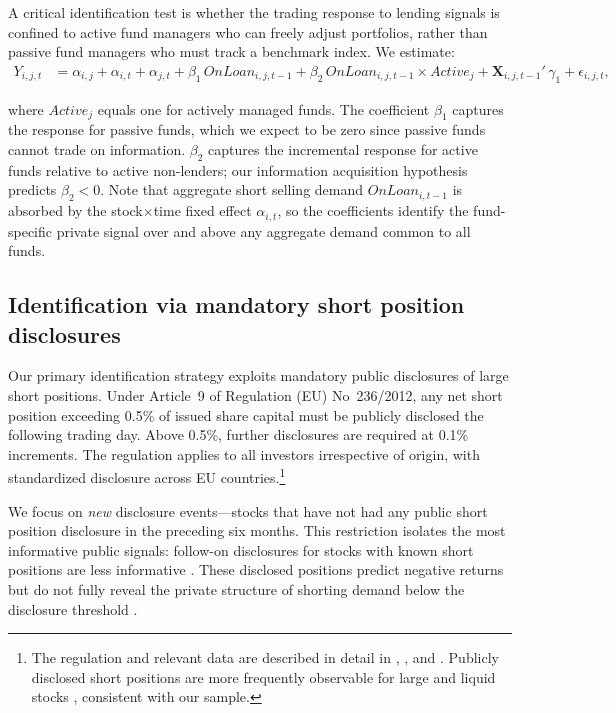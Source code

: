 A critical identification test is whether the trading response to lending signals is confined to active fund managers who can freely adjust portfolios, rather than passive fund managers who must track a benchmark index. We estimate:
\begin{align} \label{eq:baseline_active}
Y_{i,j,t} & = \alpha_{i,j} + \alpha_{i,t} + \alpha_{j,t} + \beta_{1}\, \mathit{OnLoan}_{i,j,t-1} + \beta_{2}\, \mathit{OnLoan}_{i,j,t-1} \times \mathit{Active}_{j} + \mathbf{X}_{i,j,t-1}'\,\gamma_1 + \epsilon_{i,j,t},
\end{align}

\noindent where $\mathit{Active}_j$ equals one for actively managed funds. The coefficient $\beta_1$ captures the response for passive funds, which we expect to be zero since passive funds cannot trade on information. $\beta_2$ captures the incremental response for active funds relative to active non-lenders; our information acquisition hypothesis predicts $\beta_2 < 0$. Note that aggregate short selling demand $\mathit{OnLoan}_{i,t-1}$ is absorbed by the stock$\times$time fixed effect $\alpha_{i,t}$, so the coefficients identify the fund-specific private signal over and above any aggregate demand common to all funds.

\subsection{Identification via mandatory short position disclosures} \label{subsec:identification-disclosure}

Our primary identification strategy exploits mandatory public disclosures of large short positions. Under Article~9 of Regulation (EU) No~236/2012, any net short position exceeding 0.5\% of issued share capital must be publicly disclosed the following trading day. Above 0.5\%, further disclosures are required at 0.1\% increments. The regulation applies to all investors irrespective of origin, with standardized disclosure across EU countries.\footnote{The regulation and relevant data are described in detail in \citet{jank_smajlbegovic:2015}, \citet{jones_reed_waller:16}, and \citet{jank_roling_smajlbegovic2020}. Publicly disclosed short positions are more frequently observable for large and liquid stocks \citep{jank_roling_smajlbegovic2020}, consistent with our sample.}

We focus on \textit{new} disclosure events---stocks that have not had any public short position disclosure in the preceding six months. This restriction isolates the most informative public signals: follow-on disclosures for stocks with known short positions are less informative \citep{jones_reed_waller:16}. These disclosed positions predict negative returns \citep{jank_smajlbegovic:2015} but do not fully reveal the private structure of shorting demand below the disclosure threshold \citep{jank_roling_smajlbegovic2020}.

